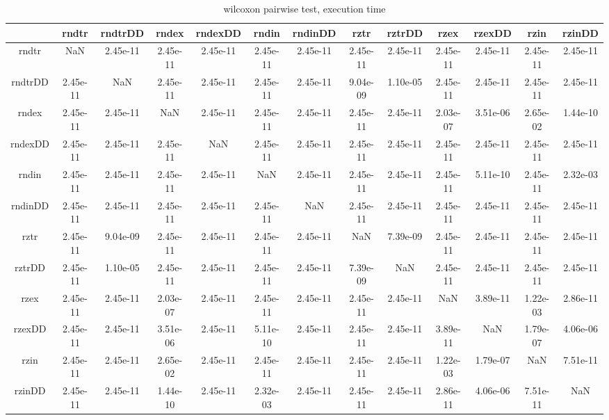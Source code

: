 \documentclass[12pt,a4paper]{article}
\begin{document}
\begin{table}[!h]
\leftskip -1.9cm
{
\scriptsize
\begin{tabular}{|*{13}{c|}}
\hline
 & rndtr & rndtrDD & rndex & rndexDD & rndin & rndinDD & rztr & rztrDD & rzex & rzexDD & rzin & rzinDD \\
 \hline
rndtr & NaN & 2.45e-11 & 2.45e-11 & 2.45e-11 & 2.45e-11 & 2.45e-11 & 2.45e-11 & 2.45e-11 & 2.45e-11 & 2.45e-11 & 2.45e-11 & 2.45e-11 \\
rndtrDD & 2.45e-11 & NaN & 2.45e-11 & 2.45e-11 & 2.45e-11 & 2.45e-11 & 9.04e-09 & 1.10e-05 & 2.45e-11 & 2.45e-11 & 2.45e-11 & 2.45e-11 \\
rndex & 2.45e-11 & 2.45e-11 & NaN & 2.45e-11 & 2.45e-11 & 2.45e-11 & 2.45e-11 & 2.45e-11 & 2.03e-07 & 3.51e-06 & 2.65e-02 & 1.44e-10 \\
rndexDD & 2.45e-11 & 2.45e-11 & 2.45e-11 & NaN & 2.45e-11 & 2.45e-11 & 2.45e-11 & 2.45e-11 & 2.45e-11 & 2.45e-11 & 2.45e-11 & 2.45e-11 \\
rndin & 2.45e-11 & 2.45e-11 & 2.45e-11 & 2.45e-11 & NaN & 2.45e-11 & 2.45e-11 & 2.45e-11 & 2.45e-11 & 5.11e-10 & 2.45e-11 & 2.32e-03 \\
rndinDD & 2.45e-11 & 2.45e-11 & 2.45e-11 & 2.45e-11 & 2.45e-11 & NaN & 2.45e-11 & 2.45e-11 & 2.45e-11 & 2.45e-11 & 2.45e-11 & 2.45e-11 \\
rztr & 2.45e-11 & 9.04e-09 & 2.45e-11 & 2.45e-11 & 2.45e-11 & 2.45e-11 & NaN & 7.39e-09 & 2.45e-11 & 2.45e-11 & 2.45e-11 & 2.45e-11 \\
rztrDD & 2.45e-11 & 1.10e-05 & 2.45e-11 & 2.45e-11 & 2.45e-11 & 2.45e-11 & 7.39e-09 & NaN & 2.45e-11 & 2.45e-11 & 2.45e-11 & 2.45e-11 \\
rzex & 2.45e-11 & 2.45e-11 & 2.03e-07 & 2.45e-11 & 2.45e-11 & 2.45e-11 & 2.45e-11 & 2.45e-11 & NaN & 3.89e-11 & 1.22e-03 & 2.86e-11 \\
rzexDD & 2.45e-11 & 2.45e-11 & 3.51e-06 & 2.45e-11 & 5.11e-10 & 2.45e-11 & 2.45e-11 & 2.45e-11 & 3.89e-11 & NaN & 1.79e-07 & 4.06e-06 \\
rzin & 2.45e-11 & 2.45e-11 & 2.65e-02 & 2.45e-11 & 2.45e-11 & 2.45e-11 & 2.45e-11 & 2.45e-11 & 1.22e-03 & 1.79e-07 & NaN & 7.51e-11 \\
rzinDD & 2.45e-11 & 2.45e-11 & 1.44e-10 & 2.45e-11 & 2.32e-03 & 2.45e-11 & 2.45e-11 & 2.45e-11 & 2.86e-11 & 4.06e-06 & 7.51e-11 & NaN \\
  \hline
\end{tabular}
\normalsize
}
\caption{wilcoxon pairwise test, execution time}
\label{wilcoxon pairwise test, execution time}
\end{table}
\end{document}
